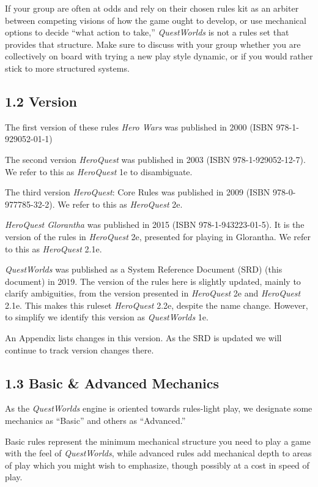 \documentclass[
]{article}
\begin{document}
If your group are often at odds and rely on their chosen rules kit as an
arbiter between competing visions of how the game ought to develop, or
use mechanical options to decide ``what action to take,''
\emph{QuestWorlds} is not a rules set that provides that structure. Make
sure to discuss with your group whether you are collectively on board
with trying a new play style dynamic, or if you would rather stick to
more structured systems.

\hypertarget{version}{%
\subsection{1.2 Version}\label{version}}

The first version of these rules \emph{Hero Wars} was published in 2000
(ISBN 978-1-929052-01-1)

The second version \emph{HeroQuest} was published in 2003 (ISBN
978-1-929052-12-7). We refer to this as \emph{HeroQuest} 1e to
disambiguate.

The third version \emph{HeroQuest}: Core Rules was published in 2009
(ISBN 978-0-977785-32-2). We refer to this as \emph{HeroQuest} 2e.

\emph{HeroQuest Glorantha} was published in 2015 (ISBN
978-1-943223-01-5). It is the version of the rules in \emph{HeroQuest}
2e, presented for playing in Glorantha. We refer to this as
\emph{HeroQuest} 2.1e.

\emph{QuestWorlds} was published as a System Reference Document (SRD)
(this document) in 2019. The version of the rules here is slightly
updated, mainly to clarify ambiguities, from the version presented in
\emph{HeroQuest} 2e and \emph{HeroQuest} 2.1e. This makes this ruleset
\emph{HeroQuest} 2.2e, despite the name change. However, to simplify we
identify this version as \emph{QuestWorlds} 1e.

An Appendix lists changes in this version. As the SRD is updated we will
continue to track version changes there.

\hypertarget{basic-advanced-mechanics}{%
\subsection{1.3 Basic \& Advanced
Mechanics}\label{basic-advanced-mechanics}}

As the \emph{QuestWorlds} engine is oriented towards rules-light play,
we designate some mechanics as ``Basic'' and others as ``Advanced.''

Basic rules represent the minimum mechanical structure you need to play
a game with the feel of \emph{QuestWorlds}, while advanced rules add
mechanical depth to areas of play which you might wish to emphasize,
though possibly at a cost in speed of play.
\end{document}
